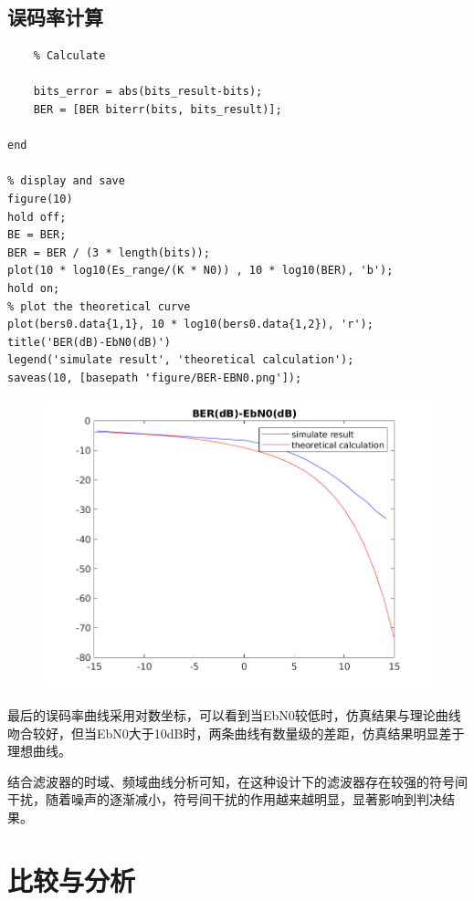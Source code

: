 \begin{spacing}{1.5}
\subsection{误码率计算}

\begin{lstlisting}
    % Calculate
    
    bits_error = abs(bits_result-bits);
    BER = [BER biterr(bits, bits_result)];
    
end

% display and save
figure(10)
hold off;
BE = BER;
BER = BER / (3 * length(bits));
plot(10 * log10(Es_range/(K * N0)) , 10 * log10(BER), 'b');
hold on;
% plot the theoretical curve
plot(bers0.data{1,1}, 10 * log10(bers0.data{1,2}), 'r');
title('BER(dB)-EbN0(dB)')
legend('simulate result', 'theoretical calculation');
saveas(10, [basepath 'figure/BER-EBN0.png']);
\end{lstlisting}

\begin{figure}[H]
\centering
\includegraphics[width = \columnwidth]{BER-EBN0.png}
\end{figure}

最后的误码率曲线采用对数坐标，可以看到当EbN0较低时，仿真结果与理论曲线吻合较好，但当EbN0大于10dB时，两条曲线有数量级的差距，仿真结果明显差于理想曲线。

结合滤波器的时域、频域曲线分析可知，在这种设计下的滤波器存在较强的符号间干扰，随着噪声的逐渐减小，符号间干扰的作用越来越明显，显著影响到判决结果。

\section{比较与分析}


\end{spacing}
